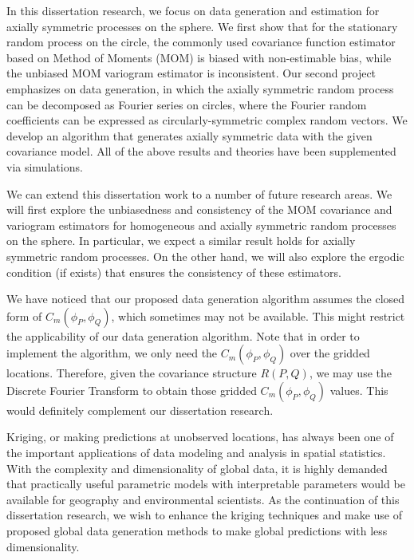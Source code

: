 %
%

In this dissertation research, we focus on data generation and estimation for axially symmetric processes on the sphere. We first show that for the stationary random process on the circle, the commonly used covariance function estimator based on Method of Moments (MOM) is biased with non-estimable bias, while the unbiased MOM variogram estimator is inconsistent. Our second project emphasizes on data generation, in which the axially symmetric random process can be decomposed as Fourier series on circles, where the Fourier random coefficients can be expressed as circularly-symmetric complex random vectors. We develop an algorithm that generates axially symmetric data with the given covariance model. All of the above results and theories have been supplemented via simulations. 

We can extend this dissertation work to a number of future research areas. We will first explore the unbiasedness and consistency of the MOM covariance and variogram estimators for homogeneous and axially symmetric random processes on the sphere. In particular, we expect a similar result holds for axially symmetric random processes. On the other hand, we will also explore the ergodic condition (if exists) that ensures the consistency of these estimators.

We have noticed that our proposed data generation algorithm assumes the closed form of $C_m(\phi_P, \phi_Q)$, which sometimes may not be available. This might restrict the applicability of our data generation algorithm. Note that in order to implement the algorithm, we only need the $C_m(\phi_P, \phi_Q)$ over the gridded locations. Therefore, given the covariance structure $R(P, Q)$, we may use the Discrete Fourier Transform to obtain those gridded $C_m(\phi_P, \phi_Q)$ values. This would definitely complement our dissertation research.

Kriging, or making predictions at unobserved locations, has always been one of the important applications of data modeling and analysis in spatial statistics. With the complexity and dimensionality of global data, it is highly demanded that practically useful parametric models with interpretable parameters would be available for geography and environmental scientists. As the continuation of this dissertation research, we wish to enhance the kriging techniques and make use of proposed global data generation methods to make global predictions with less dimensionality.

%
